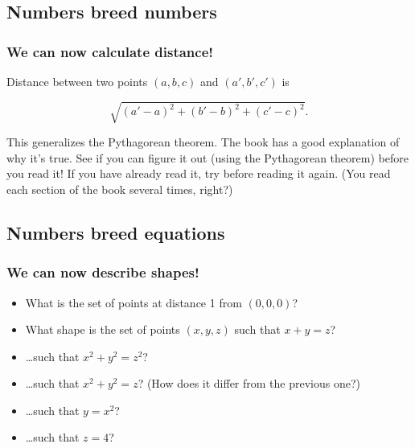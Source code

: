 \documentclass[]{article}
\begin{document}
\subsection{Numbers breed numbers}\label{numbers-breed-numbers}

\subsubsection{We can now calculate
distance!}\label{we-can-now-calculate-distance}

Distance between two points $(a,b,c)$ and $(a',b',c')$ is

\[\sqrt{(a'-a)^2+(b'-b)^2+(c'-c)^2}.\]

This generalizes the Pythagorean theorem. The book has a good
explanation of why it's true. See if you can figure it out (using the
Pythagorean theorem) before you read it! If you have already read it,
try before reading it again. (You read each section of the book several
times, right?)

\subsection{Numbers breed equations}\label{numbers-breed-equations}

\subsubsection{We can now describe
shapes!}\label{we-can-now-describe-shapes}

\begin{itemize}
\itemsep1pt\parskip0pt
\item
  What is the set of points at distance 1 from $(0,0,0)$?
\item
  What shape is the set of points $(x,y,z)$ such that $x+y=z$?
\item
  \ldots{}such that $x^2+y^2=z^2$?
\item
  \ldots{}such that $x^2+y^2=z$? (How does it differ from the previous
  one?)
\item
  \ldots{}such that $y=x^2$?
\item
  \ldots{}such that $z=4$?
\end{itemize}
\end{document}
